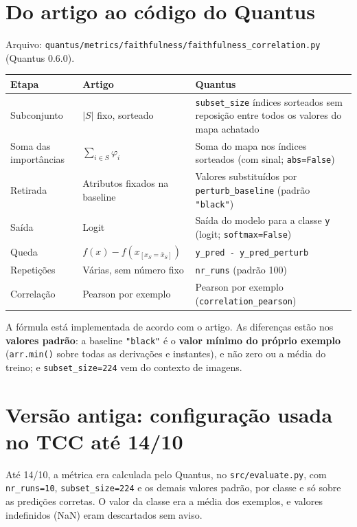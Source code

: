 \documentclass[11pt,a4paper]{article}
\begin{document}
\section{Do artigo ao código do Quantus}
Arquivo: \texttt{quantus/metrics/faithfulness/faithfulness\_correlation.py} (Quantus 0.6.0).
\begin{center}\small
\begin{tabularx}{\linewidth}{lXX}
\toprule
\textbf{Etapa} & \textbf{Artigo} & \textbf{Quantus} \\
\midrule
Subconjunto & $|S|$ fixo, sorteado & \texttt{subset\_size} índices sorteados sem reposição entre todos os valores do mapa achatado \\
Soma das importâncias & $\sum_{i \in S} \varphi_i$ & Soma do mapa nos índices sorteados (com sinal; \texttt{abs=False}) \\
Retirada & Atributos fixados na baseline & Valores substituídos por \texttt{perturb\_baseline} (padrão \texttt{"black"}) \\
Saída & Logit & Saída do modelo para a classe \texttt{y} (logit; \texttt{softmax=False}) \\
Queda & $f(x) - f(x_{[x_S=\bar{x}_S]})$ & \texttt{y\_pred - y\_pred\_perturb} \\
Repetições & Várias, sem número fixo & \texttt{nr\_runs} (padrão 100) \\
Correlação & Pearson por exemplo & Pearson por exemplo (\texttt{correlation\_pearson}) \\
\bottomrule
\end{tabularx}
\end{center}
A fórmula está implementada de acordo com o artigo. As diferenças estão nos \textbf{valores padrão}: a baseline \texttt{"black"} é o \textbf{valor mínimo do próprio exemplo} (\texttt{arr.min()} sobre todas as derivações e instantes), e não zero ou a média do treino; e \texttt{subset\_size=224} vem do contexto de imagens.

\section{Versão antiga: configuração usada no TCC até 14/10}
Até 14/10, a métrica era calculada pelo Quantus, no \texttt{src/evaluate.py}, com \texttt{nr\_runs=10}, \texttt{subset\_size=224} e os demais valores padrão, por classe e só sobre as predições corretas. O valor da classe era a média dos exemplos, e valores indefinidos (NaN) eram descartados sem aviso.
\end{document}
